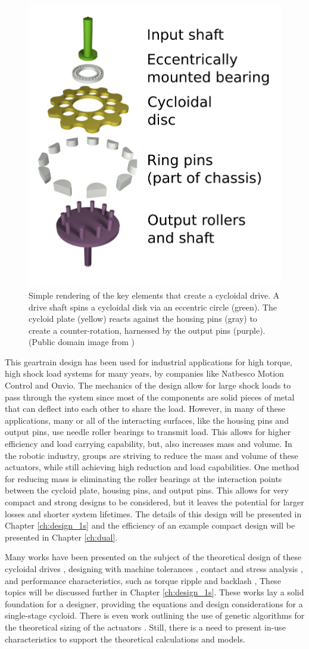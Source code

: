 \begin{figure}[t]
   \centering
   \includegraphics[width=0.40\linewidth]{fig/Cycloidal_drive_parts}
   \caption{Simple rendering of the key elements that create a cycloidal drive.
   A drive shaft spins a cycloidal disk via an eccentric circle (green).
   The cycloid plate (yellow) reacts against the housing pins (gray) to create a counter-rotation, harnessed by the output pins (purple). (Public domain image from \cite{ref:cycloid_cartoon})}
   \label{fig:cycloid_cartoon}
\end{figure}

This geartrain design has been used for industrial applications for high torque, high shock load systems for many years, by companies like Natbesco Motion Control and Onvio. The mechanics of the design allow for large shock loads to pass through the system since most of the components are solid pieces of metal that can deflect into each other to share the load. 
However, in many of these applications, many or all of the interacting surfaces, like the housing pins and output pins, use needle roller bearings to transmit load.
This allows for higher efficiency and load carrying capability, but, also increases mass and volume.
In the robotic industry, groups are striving to reduce the mass and volume of these actuators, while still achieving high reduction and load capabilities.
One method for reducing mass is eliminating the roller bearings at the interaction points between the cycloid plate, housing pins, and output pins.
This allows for very compact and strong designs to be considered, but it leaves the potential for larger losses and shorter system lifetimes. The details of this design will be presented in Chapter \ref{ch:design_1s} and the efficiency of an example compact design will be presented in Chapter \ref{ch:dual}. 

Many works have been presented on the subject of the theoretical design of these cycloidal drives \cite{ref:on_the_lobe} \cite{ref:hwang_hsieh}, designing with machine tolerances \cite{ref:design_and_application}, contact and stress analysis \cite{ref:li}, and performance characteristics, such as torque ripple and backlash \cite{ref:hsieh_traditional} \cite{ref:hsieh_dynamics}, These topics will be discussed further in Chapter \ref{ch:design_1s}.
These works lay a solid foundation for a designer, providing the equations and design considerations for a single-stage cycloid. There is even work outlining the use of genetic algorithms for the theoretical sizing of the actuators \cite{ref:single_genetic}.
Still, there is a need to present in-use characteristics to support the theoretical calculations and models.

